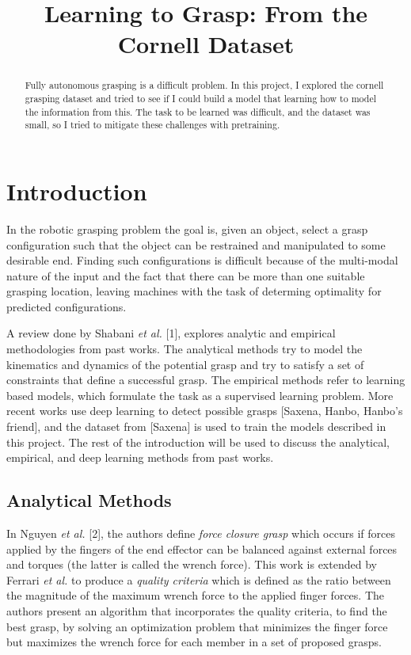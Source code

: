 \documentclass{article}
\title{Learning to Grasp: From the Cornell Dataset}
\begin{document}
\maketitle

\begin{abstract}
Fully autonomous grasping is a difficult problem. In this project, I explored
the cornell grasping dataset and tried to see if I could build a model that
learning how to model the information from this. The task to be learned was
difficult, and the dataset was small, so I tried to mitigate these challenges
with pretraining.
\end{abstract}

\section{Introduction}
In the robotic grasping problem the goal is, given an object, select a grasp
configuration such that the object can be restrained and
manipulated to some desirable end. Finding such configurations is difficult
because of the multi-modal nature of the input and the fact that there can be
more than one suitable grasping location, leaving machines with the task
of determing optimality for predicted configurations.

A review done by Shabani \textit{et al.} [1], explores analytic and empirical
methodologies from past works. The analytical
methods try to model the kinematics and dynamics of the potential grasp and try to
satisfy a set of constraints that define a successful grasp.
The empirical methods refer to learning based models, which formulate the
task as a
supervised learning problem. More recent works use deep learning to detect
possible grasps [Saxena, Hanbo, Hanbo's friend], and the dataset from [Saxena]
is used to train the models described in this project. The rest of the
introduction will be used to discuss the analytical, empirical, and deep learning
methods from past works.

\subsection{Analytical Methods}
In Nguyen \textit{et al.} [2], the authors define \textit{force closure
grasp} which occurs if forces applied by the fingers of the end
effector can be balanced against external forces and torques
(the latter is called the wrench force). This work is extended by Ferrari
\textit{et al.} \cite{ferrari92} to produce a \textit{quality criteria} which is defined as
the ratio between the magnitude of the maximum wrench force to the
applied finger forces. The authors present an algorithm that incorporates the
quality criteria, to find the best grasp, by solving an optimization problem
that minimizes the finger force but maximizes the wrench force for each member
in a set of proposed grasps.
\end{document}
